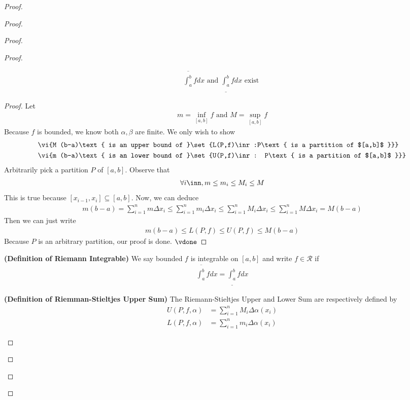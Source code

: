 \documentclass{report}
\begin{document}
\begin{proof}
\begin{proof}
\begin{proof}
\begin{proof}
\begin{theorem}
\begin{align*}
\overline{\int_a^b}fdx\text{ and }\underline{\int_a^b}fdx\text{ exist }
\end{align*}
\end{theorem}
\begin{proof}
Let 
 \begin{align*}
m =\inf_{[a,b]}f \text{ and }M =\sup_{[a,b]}f
\end{align*}
Because $f$ is bounded, we know both $\alpha,\beta $ are finite. We only wish to show 
\begin{align*}
  &\vi{M  (b-a)\text{ is an upper bound of  }\set{L(P,f)\inr:P\text{ is a partition of $[a,b]$ }}}\\
  &\vi{m  (b-a)\text{ is an lower bound of }\set{U(P,f)\inr: P\text{ is a partition of $[a,b]$ }}}
\end{align*}
Arbitrarily pick a partition $P$ of $[a,b]$. Observe that 
\begin{align*}
\forall i\inn, m \leq m_i \leq M_i\leq M 
\end{align*}
This is true because $[x_{i-1},x_i]\subseteq [a,b]$. Now, we can deduce 
\begin{align*}
m (b-a)=\sum_{i=1}^n m \Delta x_i\leq \sum_{i=1}^n m_i \Delta x_i \leq \sum_{i=1}^n M_i \Delta x_i \leq \sum_{i=1}^n M\Delta x_i =M (b-a)
\end{align*}
Then we can just write 
\begin{align*}
m (b-a)\leq L(P,f)\leq U(P,f) \leq M (b-a)
\end{align*}
Because $P$ is an arbitrary partition, our proof is done. $\vdone$
\end{proof}
\begin{definition}
\label{7.1.5}
\textbf{(Definition of Riemann Integrable)} We say bounded $f$ is integrable on $[a,b]$ and write $f\in \mathscr{R}$ if 
\begin{align*}
\overline{\int_a^b}fdx=\underline{\int_a^b}fdx
\end{align*}
\end{definition}
\begin{definition}
\label{7.1.6}
\textbf{(Definition of Riemman-Stieltjes Upper Sum)} The Riemann-Stieltjes Upper and Lower Sum are respectively defined by 
\begin{align*}
U(P,f,\alpha )&= \sum_{i=1}^n M_i \Delta \alpha (x_i)\\
L(P,f,\alpha )&=\sum_{i=1}^n m_i \Delta \alpha (x_i)

\end{align*}
\end{definition}
\end{proof}
\end{proof}
\end{proof}
\end{proof}
\end{document}
